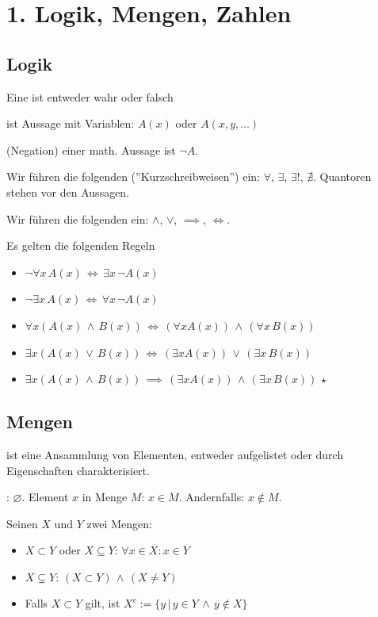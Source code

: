 \section{1. Logik, Mengen, Zahlen}
\subsection{Logik}

\Def Eine  ist entweder wahr oder falsch

\Def {} ist Aussage mit Variablen: $A(x)$ oder $A(x, y, \ldots)$ 

\Def {} (Negation) einer math. Aussage ist $\lnot A$.

\Def Wir führen die folgenden  (”Kurzschreibweisen”) ein:
$\forall$, $\exists$, $\exists!$, $\nexists$. 
Quantoren stehen vor den Aussagen.

\Def Wir führen die folgenden  ein:
$\land$, $\lor$, $\implies$, $\iff$.

\Satz Es gelten die folgenden Regeln
\vspace{-0.6em}
\begin{itemize}
    \item $\lnot \forall x \, A(x) \, \iff \, \exists x \, \lnot A(x)$
    \item $\lnot \exists x \, A(x) \, \iff \, \forall x \, \lnot A(x)$
    \item $\forall x (A(x) \, \land \, B(x)) \, \iff \, (\forall x A(x)) \, \land \, (\forall x \, B(x))$
    \item $\exists x (A(x) \, \lor \, B(x)) \, \iff \, (\exists x A(x)) \, \lor \, (\exists x \, B(x))$
    \item $\exists x (A(x) \, \land \, B(x)) \, \implies \, (\exists x A(x)) \, \land \, (\exists x \, B(x))$ \hspace{10pt} $\star$
\end{itemize}

\subsection{Mengen}

\Def {} ist eine Ansammlung von  Elementen, entweder aufgelistet
oder durch Eigenschaften charakterisiert.

: $\varnothing$. Element $x$ in Menge $M$: $x \in M$. Andernfalls: $x \notin M$.

\Def Seinen $X$ und $Y$ zwei Mengen:
\vspace{-0.6em}
\begin{itemize}
    \item {} $X \subset Y$ oder $X \subseteq Y$: $\forall x \in X : x \in Y$
    \item {} $X \subsetneq Y$: $(X \subset Y) \, \land \, (X\ne Y)$
    \item {} Falls $X \subset Y$ gilt, ist $X^c := \{y \, | \, y \in Y \, \land \, y \notin X\}$
\end{itemize}


